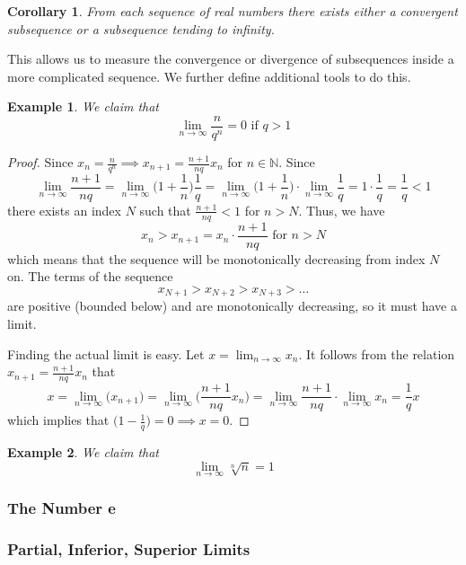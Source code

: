 \documentclass{article}
\newtheorem{example}{Example}[section]
\newtheorem{corollary}{Corollary}[theorem]
\theoremstyle{remark}
\theoremstyle{definition}
\begin{document}
\begin{corollary}
From each sequence of real numbers there exists either a convergent subsequence or a subsequence tending to infinity. 
\end{corollary}

This allows us to measure the convergence or divergence of subsequences inside a more complicated sequence. We further define additional tools to do this. 

\begin{example}
We claim that 
\[\lim_{n\rightarrow \infty} \frac{n}{q^n} = 0 \text{ if } q>1\]
\end{example}
\begin{proof}
Since $x_n = \frac{n}{q^n} \implies x_{n+1} = \frac{n+1}{nq} x_n$ for $n \in \mathbb{N}$. Since 
\[\lim_{n\rightarrow \infty} \frac{n+1}{nq} = \lim_{n \rightarrow \infty} \bigg(1 + \frac{1}{n}\bigg) \frac{1}{q} = \lim_{n\rightarrow \infty} \bigg( 1 + \frac{1}{n} \bigg) \cdot \lim_{n\rightarrow \infty} \frac{1}{q} = 1 \cdot \frac{1}{q} = \frac{1}{q} < 1\]
there exists an index $N$ such that $\frac{n+1}{nq} < 1$ for $n>N$. Thus, we have 
\[x_n > x_{n+1} = x_n \cdot \frac{n+1}{nq} \text{ for } n > N\]
which means that the sequence will be monotonically decreasing from index $N$ on. The terms of the sequence
\[x_{N+1} > x_{N+2} > x_{N+3} > \ldots\]
are positive (bounded below) and are monotonically decreasing, so it must have a limit. 

Finding the actual limit is easy. Let $x = \lim_{n \rightarrow \infty} x_n$. It follows from the relation $x_{n+1} = \frac{n+1}{nq} x_n$ that
\[x = \lim_{n\rightarrow \infty} \big(x_{n+1}\big) = \lim_{n \rightarrow \infty} \bigg(\frac{n+1}{nq} x_n \bigg) = \lim_{n \rightarrow \infty} \frac{n+1}{nq} \cdot \lim_{n \rightarrow \infty} x_n = \frac{1}{q} x\]
which implies that $\big( 1 - \frac{1}{q}\big) = 0 \implies x = 0$.
\end{proof}

\begin{example}
We claim that
\[\lim_{n\rightarrow \infty} \sqrt[n]{n} = 1\]
\end{example}

\subsubsection{The Number e}

\subsubsection{Partial, Inferior, Superior Limits}
\end{document}
